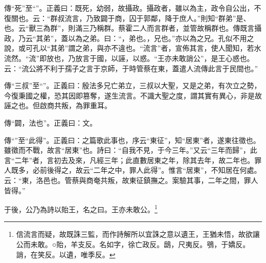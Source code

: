 {\noindent\zhuan{}\fzbyks 傳“死”至“”。正義曰：既死，幼弱，故攝政。攝政者，雖以為主，政令自公出，不復關也。云：“群叔流言，乃致闢于商，囚于郭鄰，降于庶人。”則知“群弟”是、也。云“獸三為群”，則滿三乃稱群。蔡霍二人而言群者，並管故稱群也。傳既言攝政，乃云“其弟”，蓋以為之弟。曰：“，弟也。，兄也。”亦以為之兄。孔似不用之說，或可孔以“其弟”謂之弟，與亦不違也。“流言”者，宣佈其言，使人聞知，若水流然。“流”即放也，乃放言于國，以誣，以惑。“王亦未敢誚公”，是王心惑也。云：“流公將不利于孺子之言于京師，于時管蔡在東，蓋遣人流傳此言于民間也。” \par}

{\noindent\zhuan{}\fzbyks 傳“三叔”至“”。正義曰：殷法多兄亡弟立，三叔以大聖，又是之弟，有次立之勢，今復秉國之權，恐其因即篡奪，遂生流言。不識大聖之度，謂其實有異心，非是故誣之也。但啟商共叛，為罪重耳。 \par}

{\noindent\zhuan{}\fzbyks 傳“闢，法也”。正義曰：文。 \par}

{\noindent\zhuan{}\fzbyks 傳“”至“此得”。正義曰：之篇歌此事也，序云“東征”，知“居東”者，遂東往徵也。雖徵而不戰，故言“居東”也。詩曰：“自我不見，于今三年。”又云“三年而歸”，此言“二年”者，言初去及來，凡經三年；此直數居東之年，除其去年，故二年也。罪人既多，必前後得之，故云“二年之中，罪人此得”。惟言“居東”，不知居在何處。云：“東，洛邑也。管蔡與商奄共叛，故東征鎮撫之。案驗其事，二年之間，罪人皆得。” \par}

于後，公乃為詩以貽王，名之曰。王亦未敢公。\footnote{信流言而疑，故既誅三監，而作詩解所以宜誅之意以遺王，王猶未悟，故欲讓公而未敢。○貽，羊支反。名如字，徐亡政反。鴟，尺夷反。鴞，于嬌反。誚，在笑反。以遺，唯季反。}

